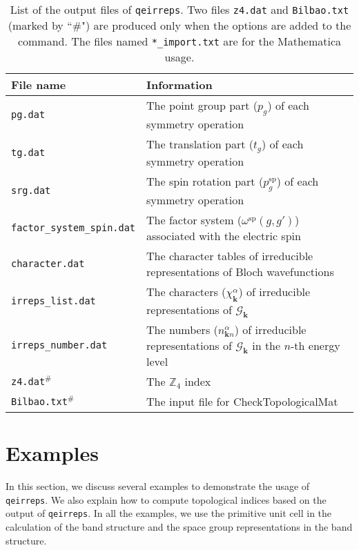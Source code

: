 \documentclass[3p,preprint]{elsarticle}
\newcommand{\mZ}{\mathbb{Z}}
\newcommand{\calGk}{\mathcal{G}_{\bm{k}}}
\begin{document}
\begin{table}[htb]
	\caption{\label{tab:qeirreps} List of the output files of \texttt{qeirreps}. Two files \texttt{z4.dat} and \texttt{Bilbao.txt} (marked by ``\#") are produced only when the options are added to the command. The files named \texttt{*\_import.txt} are for the Mathematica usage.}
	\begin{center}
	\begin{tabular}{|l|l|} \hline
		File name & Information \\ \hline \hline
		\texttt{pg.dat} & The point group part ($p_g$) of each symmetry operation \\ \hline
		\texttt{tg.dat} &  The translation part ($t_g$) of each symmetry operation \\ \hline
		\texttt{srg.dat} & The spin rotation part ($p_g^{\mathrm{sp}}$) of each symmetry operation \\ \hline
		\texttt{factor\_system\_spin.dat} & The factor system ($\omega^{\mathrm{sp}}(g,g')$) associated with the electric spin \\ \hline
		\texttt{character.dat} & The character tables of irreducible representations of Bloch wavefunctions\\ \hline
		\texttt{irreps\_list.dat} & The characters ($\chi_{\bm{k}}^\alpha$) of irreducible representations of $\calGk$\\ \hline
		\texttt{irreps\_number.dat} & The numbers ($n_{\bm{k}n}^\alpha$) of irreducible representations of $\calGk$ in the $n$-th energy level \\ \hline
		\texttt{z4.dat}$^\#$ & The $\mZ_4$ index \\ \hline
		\texttt{Bilbao.txt}$^\#$ & The input file for CheckTopologicalMat~\cite{Vergniory2019} \\ \hline		
	\end{tabular}
	\end{center}
\end{table}


\section{Examples}\label{sec:ex}

In this section, we discuss several examples to demonstrate the usage of \texttt{qeirreps}.
We also explain how to compute topological indices based on the output of \texttt{qeirreps}.
In all the examples, we use the primitive unit cell in the calculation of the band structure and the space group representations in the band structure.
\end{document}
